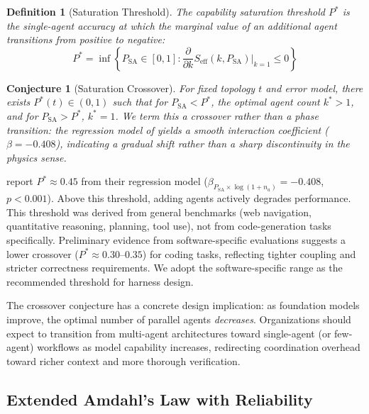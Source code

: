 \documentclass[11pt, a4paper, logo, copyright]{googledeepmind}
\newtheorem{definition}{Definition}[section]
\newtheorem{conjecture}{Conjecture}[section]
\begin{document}
\begin{definition}[Saturation Threshold]
\label{def:saturation}
The capability saturation threshold $P^*$ is the single-agent accuracy at which the marginal value of an additional agent transitions from positive to negative:
\begin{equation}
    P^* = \inf \left\{ P_{\mathrm{SA}} \in [0,1] : \frac{\partial}{\partial k} S_{\mathrm{eff}}(k, P_{\mathrm{SA}}) \Big|_{k=1} \leq 0 \right\}
\end{equation}
\end{definition}

\begin{conjecture}[Saturation Crossover]
\label{conj:phase}
For fixed topology $t$ and error model, there exists $P^*(t) \in (0,1)$ such that for $P_{\mathrm{SA}} < P^*$, the optimal agent count $k^* > 1$, and for $P_{\mathrm{SA}} > P^*$, $k^* = 1$. We term this a crossover rather than a phase transition: the regression model of \citet{kim2025scaling} yields a smooth interaction coefficient ($\beta = -0.408$), indicating a gradual shift rather than a sharp discontinuity in the physics sense.
\end{conjecture}

\citet{kim2025scaling} report $P^* \approx 0.45$ from their regression model ($\beta_{P_{\mathrm{SA}} \times \log(1+n_a)} = -0.408$, $p < 0.001$). Above this threshold, adding agents actively degrades performance. This threshold was derived from general benchmarks (web navigation, quantitative reasoning, planning, tool use), not from code-generation tasks specifically. Preliminary evidence from software-specific evaluations suggests a lower crossover ($P^* \approx 0.30$--$0.35$) for coding tasks, reflecting tighter coupling and stricter correctness requirements. We adopt the software-specific range as the recommended threshold for harness design.

The crossover conjecture has a concrete design implication: as foundation models improve, the optimal number of parallel agents \emph{decreases}. Organizations should expect to transition from multi-agent architectures toward single-agent (or few-agent) workflows as model capability increases, redirecting coordination overhead toward richer context and more thorough verification.

\subsection{Extended Amdahl's Law with Reliability}
\end{document}
